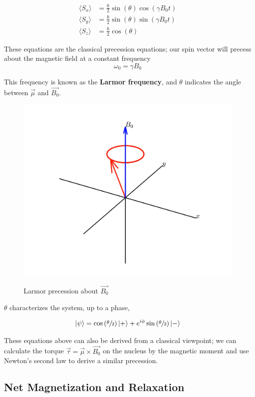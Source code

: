 \documentclass[%
 reprint,
 amsmath,amssymb,
 aps,
]{revtex4-2}
\DeclarePairedDelimiter\ket{\lvert}{\rangle}
\begin{document}
\begin{align*}
    \langle S_x \rangle &= \frac{\hbar}{2} \sin(\theta)\cos(\gamma B_0 t)\\
    \langle S_y \rangle &= \frac{\hbar}{2} \sin(\theta)\sin(\gamma B_0 t)\\
    \langle S_z \rangle &= \frac{\hbar}{2} \cos(\theta)   
\end{align*}

These equations are the classical precession equations; our spin vector will precess about the magnetic field at a constant frequency
\begin{equation}
    \omega_0 = \gamma B_0 
\end{equation}

This frequency is known as the \textbf{Larmor frequency}, and $\theta$ indicates the angle between $\vec{\mu}$ and $\vec{B_0}$. \cite{griffiths}

\begin{figure}[h]
    \centering
    {\includegraphics[width = 0.6\linewidth]{figs/larmor-precession.png}}

    \caption{Larmor precession about $\vec{B_0}$}
\end{figure}

$\theta$ characterizes the system, up to a phase,

\begin{gather*}
    \ket{\psi} = \cos\left(\sfrac{\theta}{2}\right)\ket{+}+ e^{i\phi}\sin\left(\sfrac{\theta}{2}\right) \ket{-}
\end{gather*}

These equations above can also be derived from a classical viewpoint; we can calculate the torque $\vec{\tau}  =\vec{ \mu }\times \vec{B_0}$ on the nucleus by the magnetic moment and use Newton's second law to derive a similar precession.

\subsection{\label{subsec:pulses} Net Magnetization and Relaxation}
\end{document}
